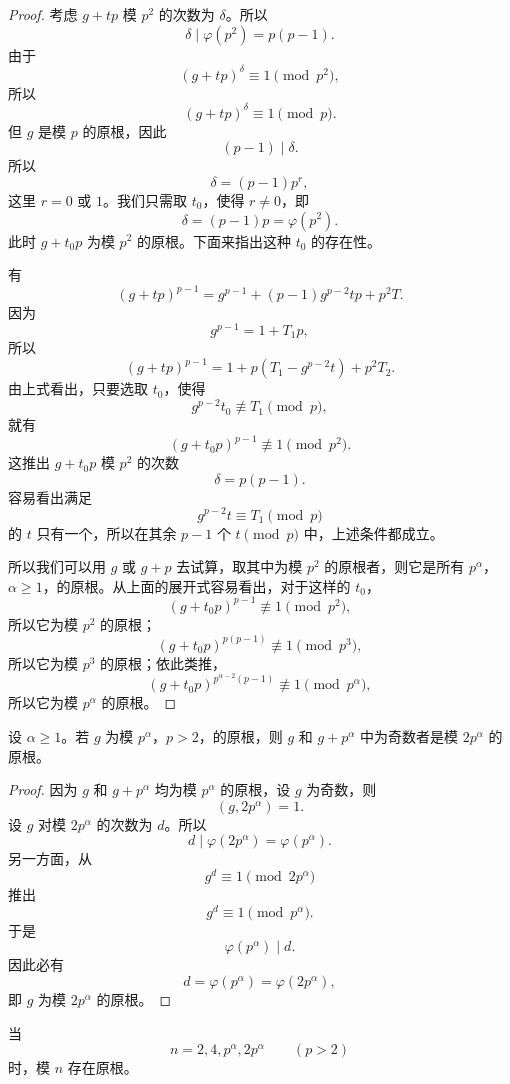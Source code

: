 \begin{proof}
	考虑 $g+tp$ 模 $p^2$ 的次数为 $\delta$。所以
	\[
		\delta\mid \varphi(p^2)=p(p-1).
	\]
	由于
	\[
		(g+tp)^\delta\equiv 1\pmod {p^2},
	\]
	所以
	\[
		(g+tp)^\delta\equiv 1\pmod p.
	\]
	但 $g$ 是模 $p$ 的原根，因此
	\[
		(p-1)\mid \delta.
	\]
	所以
	\[
		\delta=(p-1)p^r,
	\]
	这里 $r=0$ 或 $1$。我们只需取 $t_0$，使得 $r\neq 0$，即
	\[
		\delta=(p-1)p=\varphi(p^2).
	\]
	此时 $g+t_0p$ 为模 $p^2$ 的原根。下面来指出这种 $t_0$ 的存在性。

	有
	\[
		(g+tp)^{p-1}
		=
		g^{p-1}+(p-1)g^{p-2}tp+p^2T.
	\]
	因为
	\[
		g^{p-1}=1+T_1p,
	\]
	所以
	\[
		(g+tp)^{p-1}
		=
		1+p(T_1-g^{p-2}t)+p^2T_2.
	\]
	由上式看出，只要选取 $t_0$，使得
	\[
		g^{p-2}t_0\not\equiv T_1\pmod p,
	\]
	就有
	\[
		(g+t_0p)^{p-1}\not\equiv 1\pmod {p^2}.
	\]
	这推出 $g+t_0p$ 模 $p^2$ 的次数
	\[
		\delta=p(p-1).
	\]
	容易看出满足
	\[
		g^{p-2}t\equiv T_1\pmod p
	\]
	的 $t$ 只有一个，所以在其余 $p-1$ 个 $t\pmod p$ 中，上述条件都成立。

	所以我们可以用 $g$ 或 $g+p$ 去试算，取其中为模 $p^2$ 的原根者，则它是所有 $p^\alpha$，$\alpha\geq 1$，的原根。从上面的展开式容易看出，对于这样的 $t_0$，
	\[
		(g+t_0p)^{p-1}\not\equiv 1\pmod {p^2},
	\]
	所以它为模 $p^2$ 的原根；
	\[
		(g+t_0p)^{p(p-1)}\not\equiv 1\pmod {p^3},
	\]
	所以它为模 $p^3$ 的原根；依此类推，
	\[
		(g+t_0p)^{p^{\alpha-2}(p-1)}
		\not\equiv 1\pmod {p^\alpha},
	\]
	所以它为模 $p^\alpha$ 的原根。
\end{proof}

\begin{lemma}[原文 引理 4]
	设 $\alpha\geq 1$。若 $g$ 为模 $p^\alpha$，$p>2$，的原根，则 $g$ 和 $g+p^\alpha$ 中为奇数者是模 $2p^\alpha$ 的原根。
\end{lemma}

\begin{proof}
	因为 $g$ 和 $g+p^\alpha$ 均为模 $p^\alpha$ 的原根，设 $g$ 为奇数，则
	\[
		(g,2p^\alpha)=1.
	\]
	设 $g$ 对模 $2p^\alpha$ 的次数为 $d$。所以
	\[
		d\mid \varphi(2p^\alpha)=\varphi(p^\alpha).
	\]
	另一方面，从
	\[
		g^d\equiv 1\pmod {2p^\alpha}
	\]
	推出
	\[
		g^d\equiv 1\pmod {p^\alpha}.
	\]
	于是
	\[
		\varphi(p^\alpha)\mid d.
	\]
	因此必有
	\[
		d=\varphi(p^\alpha)=\varphi(2p^\alpha),
	\]
	即 $g$ 为模 $2p^\alpha$ 的原根。
\end{proof}

\begin{theorem}[原文 定理 11]
	当
	\[
		n=2,4,p^\alpha,2p^\alpha\qquad (p>2)
	\]
	时，模 $n$ 存在原根。
\end{theorem}

